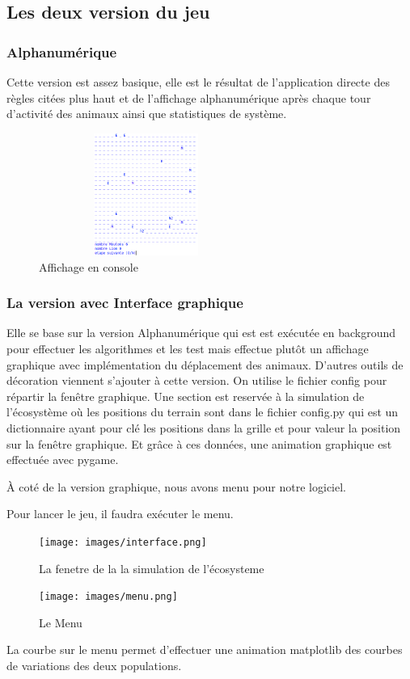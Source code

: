 \documentclass[a4paper,12pt]{article} %
\begin{document}
\subsection{Les deux version du jeu}
\subsubsection{Alphanumérique}
Cette version est assez basique, elle est le résultat de l'application directe des règles citées plus haut et de l'affichage alphanumérique après chaque tour d'activité des animaux ainsi que statistiques de système.
\begin{figure}[h]
    \centering
    \includegraphics[width=7cm, height=4cm]{images/console.png}
    \caption{Affichage en console}
\end{figure}
\subsubsection{La version avec Interface graphique}
Elle se base sur la version Alphanumérique qui est est exécutée en background pour effectuer les algorithmes et les test mais effectue plutôt un affichage graphique avec implémentation du déplacement des animaux. D'autres outils de décoration viennent s'ajouter à cette version. On utilise le fichier config pour répartir la fenêtre graphique.
Une section est reservée à la simulation de l'écosystème où les positions du terrain sont dans le fichier config.py qui est un dictionnaire ayant pour clé les positions dans la grille et pour valeur la position sur la fenêtre graphique. Et grâce à ces données, une animation graphique est effectuée avec pygame.

À coté de la version graphique, nous avons menu pour notre logiciel.

Pour lancer le jeu, il faudra exécuter le menu.

\begin{figure}[h]
    \begin{minipage}[c]{.46\linewidth}
        \centering
        \texttt{[image: images/interface.png]}
        \caption{La fenetre de la la simulation de l'écosysteme}
    \end{minipage}
    \hfill%
    \begin{minipage}[c]{.46\linewidth}
        \centering
        \texttt{[image: images/menu.png]}
        \caption{Le Menu}
    \end{minipage}
\end{figure}
La courbe sur le menu permet d'effectuer une animation matplotlib des courbes de variations des deux populations.
\end{document}
